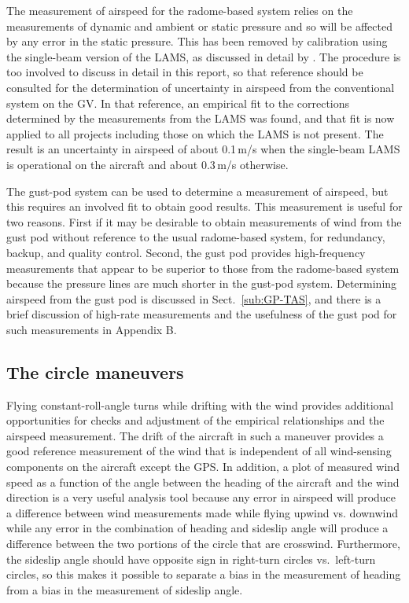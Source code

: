 \documentclass[12pt,twoside,english]{article}\usepackage[]{graphicx}\usepackage[]{color}
\let\OrgIndex\index
\renewcommand*{\index}[1]{\OrgIndex{#1}}
\begin{document}
{{
The measurement of airspeed for the radome-based system relies on the measurements of dynamic and ambient or static pressure and so will be affected by any error in the static pressure. This has been removed by calibration using the single-beam version of the LAMS, as discussed in detail by \citet{CooperEtAl2014}. The procedure is too involved to discuss in detail in this report, so that reference should be consulted for the determination of uncertainty in airspeed from the conventional system on the GV\@. In that reference, an empirical fit to the corrections determined by the measurements from the LAMS was found, and that fit is now applied to all projects including those on which the LAMS is not present. The result is an uncertainty in airspeed of about 0.1\,m/s when the single-beam LAMS is operational on the aircraft and about 0.3\,m/s otherwise. 

The gust-pod system can be used to determine a measurement of airspeed, but this requires an involved fit to obtain good results. This measurement is useful for two reasons. First if it may be desirable to obtain measurements of wind from the gust pod without reference to the usual radome-based system, for redundancy, backup, and quality control. Second, the gust pod provides high-frequency measurements that appear to be superior to those from the radome-based system because the pressure lines are much shorter in the gust-pod system. Determining airspeed from the gust pod is discussed in Sect.~\ref{sub:GP-TAS}, and there is a brief discussion of high-rate measurements and the usefulness of the gust pod for such measurements in Appendix B. 

\subsection{The circle maneuvers\label{sub:circle-summary}}

Flying constant-roll-angle turns while drifting with the wind provides additional  opportunities for checks and adjustment of the empirical relationships and the airspeed measurement. The drift of the aircraft in such a maneuver provides a good reference measurement of the wind that is independent of all wind-sensing components on the aircraft except the GPS. In addition, a plot of measured wind speed as a function of the angle between the heading of the aircraft and the wind direction is a very useful analysis tool because any error in airspeed will produce a difference between wind measurements made while flying upwind vs\@. downwind while any error in the combination of heading and sideslip angle will produce a difference between the two portions of the circle that are crosswind. Furthermore, the sideslip angle should have opposite sign in right-turn circles vs.~left-turn circles, so this makes it possible to separate a bias in the measurement of heading from a bias in the measurement of sideslip angle. 

}}
\end{document}
